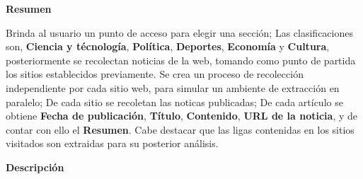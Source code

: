 
\begin{large}
	\textbf{Resumen}\\
\end{large}

Brinda al usuario un punto de acceso para elegir una sección; Las clasificaciones son, 
\textbf{Ciencia y técnología}, \textbf{Política}, \textbf{Deportes}, \textbf{Economía} y  
\textbf{Cultura}, posteriormente se recolectan noticias de la web, tomando como punto de 
partida los sitios establecidos previamente. Se crea un proceso de 
recolección independiente por cada sitio web, para simular un ambiente de extracción 
en paralelo; De cada sitio se recoletan las noticas publicadas; De cada artículo se obtiene 
\textbf{Fecha de publicación}, \textbf{Título}, \textbf{Contenido}, \textbf{URL de la noticia}, y de contar con ello el \textbf{Resumen}. Cabe destacar que 
las ligas contenidas en los sitios visitados son extraidas para su posterior análisis.\\

\begin{large}
	\textbf{Descripción}\\
\end{large} 


